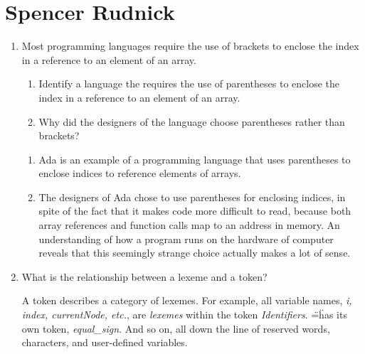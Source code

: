 
\chapter{Spencer Rudnick}

\begin{enumerate}
  \item Most programming languages require the use of brackets to
    enclose the index in a reference to an element of an array.
  \begin{enumerate}
    \item Identify a language the requires the use of parentheses
      to enclose the index in a reference to an element of an array.
    \item Why did the designers of the language choose parentheses
      rather than brackets?
    \end{enumerate}

  \begin{answer}

  \begin{enumerate}
    \item Ada is an example of a programming language that uses
      parentheses to enclose indices to reference elements of arrays.
    \item The designers of Ada chose to use parentheses for enclosing
      indices, in spite of the fact that it makes code more difficult
      to read, because both array references and function calls map to
      an address in memory. An understanding of how a program runs on
      the hardware of computer reveals that this seemingly strange
      choice actually makes a lot of sense.
    \end{enumerate}

    \end{answer}
    
  \item What is the relationship between a lexeme and a token?

  \begin{answer}

    A token describes a category of lexemes. For example, all variable
    names, \textit{i, index, currentNode, etc.}, are \textit{lexemes}
    within the token \textit{Identifiers}. \"=\" has its own token,
    \textit{equal\_sign}. And so on, all down the line of reserved
    words, characters, and user-defined variables.

    \end{answer}


\end{enumerate}
